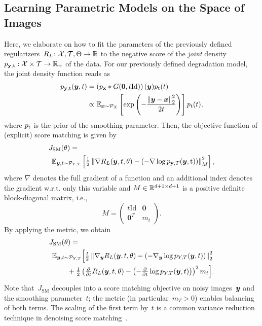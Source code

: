 \documentclass[nohyperref]{article}
\newcommand{\X}{\mathcal{X}}
\newcommand{\T}{\mathcal{T}}
\newcommand{\id}{\mathrm{Id}}
\newcommand{\norm}[1]{\left\Vert#1\right\Vert}
\renewcommand{\vec}[1]{\mathbf{#1}}
\newcommand{\dist}[1]{\mathcal{P}_{#1}}
\newcommand{\pdf}[1]{p_{#1}}
\theoremstyle{plain}
\theoremstyle{definition}
\theoremstyle{remark}
\begin{document}
\subsection{Learning Parametric Models on the Space of Images}
Here, we elaborate on how to fit the parameters of the previously defined regularizers~$R_L\colon\X,\T,\Theta\to\R$ to the negative score of the \emph{joint} density~$\pdf{\rvy,\rt}:\X\times\T\to\R_+$ of the data.
For our previously defined degradation model, the joint density function reads as
\begin{align*}
\pdf{\rvy,\rt}(\vy,t) &= \left(\pdf{\rvx}\ast G(\vec{0},t\id)\right)(\vy) \pdf{\rt}(t)\\
&\propto \E_{\vx\sim\dist{X}}\left[\exp\left(-\frac{\norm{\vy-\vx}_2^2}{2 t}\right)\right] \pdf{\rt}(t),
\end{align*}
where $\pdf{\rt}$ is the prior of the smoothing parameter.
Then, the objective function of (explicit) score matching is given by
\begin{align} \label{eq:jsm}
&J_\mathrm{SM}(\theta) = \\
&\hspace{1ex}\E_{\vy,t\sim\dist{Y,T}}\left[\tfrac12\norm{\nabla R_L(\vy,t,\theta) -\left(- \nabla\log p_{\rvy,T}(\vy,\rt)\right)}_M^2\right], \notag
\end{align}
where $\nabla$ denotes the full gradient of a function and an additional index denotes the gradient w.r.t. only this variable and 
$M\in\mathbb{R}^{d+1\times d+1}$ is a positive definite block-diagonal matrix, i.e.,
\[
M = \begin{pmatrix}
t\id & \vec{0} \\
\vec{0}^T & m_t
\end{pmatrix}.
\]
By applying the metric, we obtain
\begin{align}\label{eq:jsmParts}
&J_\mathrm{SM}(\theta)=\\
&\hspace{1ex}\E_{\vy,t\sim\dist{Y,T}}\Big[\tfrac{t}{2}\norm{\nabla_\vy R_L(\vy,t,\theta) -\left(- \nabla_\vy\log p_{Y,T}(\vy,t)\right)}_2^2 \notag\\
&\hspace{6ex}+\tfrac12\left(\tfrac{\partial}{\partial t}R_L(\vy,t,\theta) -\left(-\tfrac{\partial}{\partial t}\log p_{Y,T}(\vy,t)\right)\right)^2m_t\Big].\notag
\end{align}
Note that~$J_\mathrm{SM}$ decouples into a score matching objective on noisy images~${\bm{y}}$ and the smoothing parameter~$t$; the metric (in particular~$m_T>0$) enables balancing of both terms.
The scaling of the first term by~$t$ is a common variance reduction technique in denoising score matching~\citep{SoEr19,HuLi21}.
\end{document}
